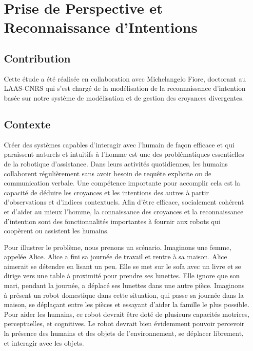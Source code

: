 \documentclass[a4paper,11pt,twoside]{StyleThese}
\begin{document}
\setcounter{chapter}{4} %
\dominitoc
\faketableofcontents
\fi

\chapter{Prise de Perspective et Reconnaissance d'Intentions}
\label{chapter4}
\minitoc

\section{Contribution}
Cette étude a été réalisée en collaboration avec Michelangelo Fiore, doctorant au LAAS-CNRS qui s'est chargé de la modélisation de la reconnaissance d'intention basée sur notre système de modélisation et de gestion des croyances divergentes.

\section{Contexte}
Créer des systèmes capables d'interagir avec l'humain de façon efficace et qui paraissent naturels et intuitifs à l'homme est une des problématiques essentielles de la robotique d'assistance. Dans leurs activités quotidiennes, les humains collaborent régulièrement sans avoir besoin de requête explicite ou de communication verbale. Une compétence importante pour accomplir cela est la capacité de déduire les croyances et les intentions des autres à partir d'observations et d'indices contextuels. Afin d'être efficace, socialement cohérent et d'aider au mieux l'homme, la connaissance des croyances et la reconnaissance d'intention sont des fonctionnalités importantes à fournir aux robots qui coopèrent ou assistent les humains.

Pour illustrer le problème, nous prenons un scénario. Imaginons une femme, appelée Alice. Alice a fini sa journée de travail et rentre à sa maison. Alice aimerait se détendre en lisant un peu. Elle se met sur le sofa avec un livre et se dirige vers une table à proximité pour prendre ses lunettes. Elle ignore que son mari, pendant la journée, a déplacé ses lunettes dans une autre pièce.
Imaginons à présent un robot domestique dans cette situation, qui passe sa journée dans la maison, se déplaçant entre les pièces et essayant d'aider la famille le plus possible. Pour aider les humains, ce robot devrait être doté de plusieurs capacités motrices, perceptuelles, et cognitives. Le robot devrait bien évidemment pouvoir percevoir la présence des humains et des objets de l'environnement, se déplacer librement, et interagir avec les objets.
\end{document}
